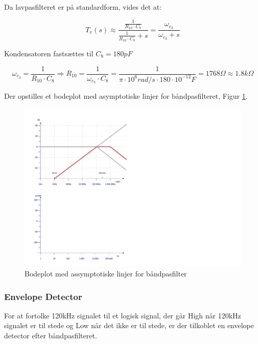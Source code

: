 Da lavpasfilteret er på standardform, vides det at:

\begin{displaymath}
T_{v}(s)\approx \dfrac{ \tfrac{ 1 }{ R_{10} \cdot C_{8}} }{ \tfrac{ 1 }{ R_{10} \cdot C_{8}} +s }=
\dfrac{\omega_{c_{3}}}{\omega_{c_{3}}+s}
\end{displaymath}

Kondensatoren fastsættes til $C_{8}=180pF$

\begin{displaymath}
\omega_{c_{3}} = \dfrac{ 1 }{ R_{10} \cdot C_{8}} \Rightarrow 
R_{10}=\dfrac{1}{\omega_{c_{3}} \cdot C_{8}}=
\dfrac{1}{\pi \cdot 10^{6} rad/s \cdot 180 \cdot 10^{-12}F}=1768\Omega \approx 1.8k\Omega
\end{displaymath}

Der opstilles et bodeplot med asymptotiske linjer for båndpasfilteret, Figur \ref{fig:BodePlotBPF}. 

\begin{figure}[h]
	\centering
	\includegraphics[scale=0.5, trim=50 430 590 50, clip=true]{../HardwareDesign/Diagrammer/BodePlotBPF.pdf}
	\caption{Bodeplot med assymptotiske linjer for båndpasfilter}
	\label{fig:BodePlotBPF}
\end{figure}

\subsubsection{Envelope Detector}
For at fortolke 120kHz signalet til et logisk signal, der går High når 120kHz signalet er til stede og Low når det ikke er til stede, er der tilkoblet en envelope detector efter båndpasfilteret.

